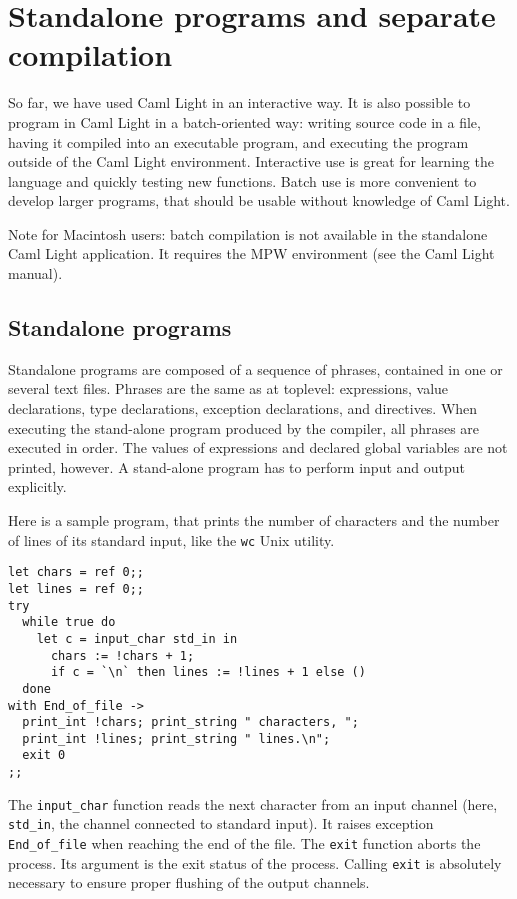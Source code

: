 \chapter{Standalone programs and separate compilation\label{c:standalone}}

So far, we have used Caml Light in an interactive way. It is also
possible to program in Caml Light in a batch-oriented way: writing
source code in a file, having it compiled into an executable program,
and executing the program outside of the Caml Light environment.
Interactive use is great for learning the language and quickly testing
new functions. Batch use is more convenient to develop larger
programs, that should be usable without knowledge of Caml Light.

Note for Macintosh users: batch compilation is not available
in the standalone Caml Light application. It requires the MPW
environment (see the Caml Light manual).


\section{Standalone programs}

Standalone programs are composed of a sequence of phrases, contained
in one or several text files. Phrases are the same as at toplevel:
expressions, value declarations, type declarations, exception
declarations, and directives. When executing the stand-alone program
produced by the compiler, all phrases are executed in order. The
values of expressions and declared global variables are not printed,
however. A stand-alone program has to perform input and output
explicitly.

Here is a sample program, that prints the number of characters and the
number of lines of its standard input, like the \verb"wc" Unix
utility.

\begin{verbatim}
let chars = ref 0;;
let lines = ref 0;;
try
  while true do
    let c = input_char std_in in
      chars := !chars + 1;
      if c = `\n` then lines := !lines + 1 else ()
  done
with End_of_file ->
  print_int !chars; print_string " characters, ";
  print_int !lines; print_string " lines.\n";
  exit 0
;;
\end{verbatim}

The \verb"input_char" function reads the next character from an input
channel (here, \verb"std_in", the channel connected to standard input).
It raises exception \verb"End_of_file" when reaching the end of the
file. The \verb"exit" function aborts the process. Its argument is the
exit status of the process. Calling \verb"exit" is absolutely necessary to
ensure proper flushing of the output channels.

